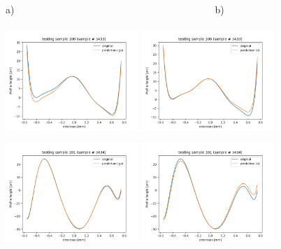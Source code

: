 \documentclass{iucr}
\begin{document}
\begin{figure}\label{fig:v14profiles}
    a)~~~~~~~~~~~~~~~~~~~~~~~~~~~~~~~~~~~~~~~~~b)~~~~~~~~~~~~~~~~~~\\
    \includegraphics[width=0.45\textwidth]{figures/v13p100.png}
    \includegraphics[width=0.45\textwidth]{figures/v14p100.png}

    \includegraphics[width=0.45\textwidth]{figures/v13p101.png}
    \includegraphics[width=0.45\textwidth]{figures/v14p101.png}


\end{figure}
\end{document}
